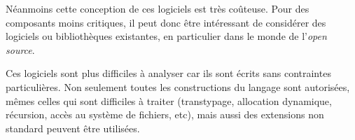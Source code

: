 Néanmoins cette conception de ces logiciels est très coûteuse. Pour des
composants moins critiques, il peut donc être intéressant de considérer des
logiciels ou bibliothèques existantes, en particulier dans le monde de
l'\emph{open source}.

Ces logiciels sont plus difficiles à analyser car ils sont écrits sans
contraintes particulières. Non seulement toutes les constructions du langage
sont autorisées, mêmes celles qui sont difficiles à traiter (transtypage,
allocation dynamique, récursion, accès au système de fichiers, etc), mais aussi
des extensions non standard peuvent être utilisées.








